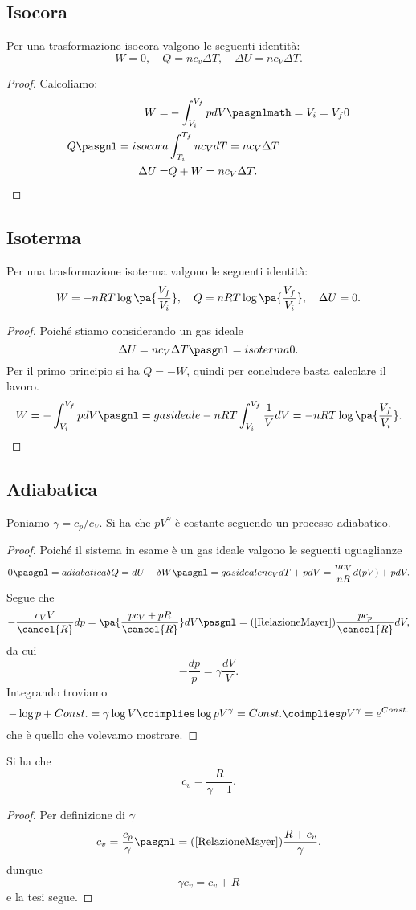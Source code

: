 \subsection{Isocora}
\begin{proposition}\label{EnergieIsocora}
Per una trasformazione isocora valgono le seguenti identit\`a:
\[W=0,\quad
Q=nc_v\Delta T,\quad
\Delta U=nc_V\Delta T.\]
\end{proposition}
\begin{proof}
Calcoliamo:
\begin{align*}
W=&-\int_{V_i}^{V_f}pdV\pasgnlmath={V_i=V_f}0\\
Q\pasgnl={isocora}&\int_{T_i}^{T_f}nc_VdT=nc_V\Delta T\\
\Delta U=&Q+W=nc_V\Delta T.
\end{align*}
\end{proof}

\subsection{Isoterma}
\begin{proposition}\label{EnergieIsoterma}
Per una trasformazione isoterma valgono le seguenti identit\`a:
\[W=-nRT\log\pa{\frac{V_f}{V_i}},\quad
Q=nRT\log\pa{\frac{V_f}{V_i}},\quad
\Delta U=0.\]
\end{proposition}
\begin{proof}
Poich\'e stiamo considerando un gas ideale \[\Delta U=nc_V\Delta T\pasgnl={isoterma}0.\] 
Per il primo principio si ha $Q=-W$, quindi per concludere basta calcolare il lavoro.
\[W=-\int_{V_i}^{V_f}pdV\pasgnl={gas ideale}-nRT\int_{V_i}^{V_f}\frac1VdV=-nRT\log\pa{\frac{V_f}{V_i}}.\]
\end{proof}

\subsection{Adiabatica}
\begin{proposition}\label{EquazioneStatoAdiabatica}
Poniamo $\gamma=c_p/c_V$. Si ha che $pV^\gamma$ \`e costante seguendo un processo adiabatico.
\end{proposition}
\begin{proof}
Poich\'e il sistema in esame \`e un gas ideale valgono le seguenti uguaglianze
\[0\pasgnl={adiabatica}\delta Q=dU-\delta W\pasgnl={gas ideale}nc_VdT+pdV=\frac{nc_V}{nR}d(pV)+p dV.\]
Segue che
\[-\frac{c_VV}{\cancel{R}}dp=\pa{\frac{pc_V+pR}{\cancel{R}}}dV\pasgnl={(\ref{RelazioneMayer})}\frac{pc_p}{\cancel{R}}dV,\]
da cui
\[-\frac{dp}p=\gamma\frac{dV}V.\]
Integrando troviamo
\[-\log p+Const.=\gamma\log V\coimplies \log pV^\gamma=Const.\coimplies pV^\gamma=e^{Const.}\]
che \`e quello che volevamo mostrare.
\end{proof}
\begin{remark}
Si ha che \[c_v=\frac R{\gamma-1}.\]
\end{remark}
\begin{proof}
Per definizione di $\gamma$
\[c_v=\frac{c_p}\gamma\pasgnl={(\ref{RelazioneMayer})}\frac{R+c_v}\gamma,\]
dunque
\[\gamma c_v=c_v+R\]
e la tesi segue.
\end{proof}

